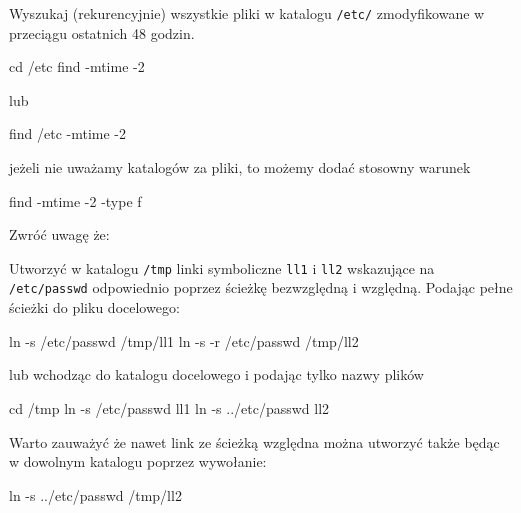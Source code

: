 \dbEntryCheckResults
Wyszukaj (rekurencyjnie) wszystkie pliki w katalogu \texttt{/etc/} zmodyfikowane w przeciągu ostatnich 48 godzin.
\fi
{}\dbEntryCheckResults
\begin{CodeFrame*}[bash]{}
cd /etc
find -mtime -2
\end{CodeFrame*}

lub

\begin{CodeFrame*}[bash]{}
find /etc -mtime -2
\end{CodeFrame*}

jeżeli nie uważamy katalogów za pliki, to możemy dodać stosowny warunek

\begin{CodeFrame*}[bash]{}
find -mtime -2 -type f
\end{CodeFrame*}

\noindent Zwróć uwagę że:
\fi


\dbEntryCheckResults
Utworzyć w katalogu \texttt{/tmp} linki symboliczne \texttt{ll1} i \texttt{ll2} wskazujące na \texttt{/etc/passwd} odpowiednio poprzez ścieżkę bezwzględną i względną.
\fi
{}\dbEntryCheckResults
Podając pełne ścieżki do pliku docelowego:

\begin{CodeFrame*}[bash]{}
ln -s /etc/passwd /tmp/ll1
ln -s -r /etc/passwd /tmp/ll2
\end{CodeFrame*}

lub wchodząc do katalogu docelowego i podając tylko nazwy plików

\begin{CodeFrame*}[bash]{}
cd /tmp
ln -s /etc/passwd ll1
ln -s ../etc/passwd ll2
\end{CodeFrame*}

Warto zauważyć że nawet link ze ścieżką względna można utworzyć także będąc w dowolnym katalogu poprzez wywołanie:

\begin{CodeFrame*}[bash]{}
ln -s ../etc/passwd /tmp/ll2
\end{CodeFrame*}


